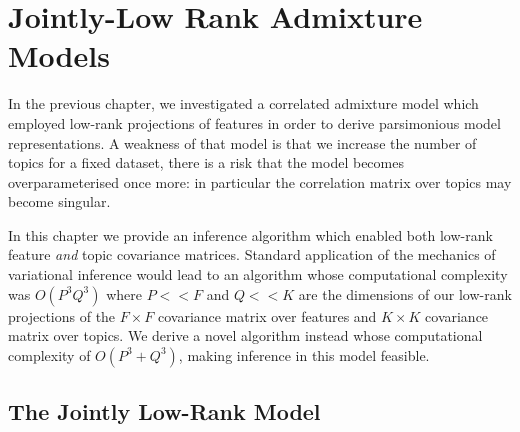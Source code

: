 %
\newcommand{\lm}[1] {
	#1^{\setminus m}
}

\newcommand \model[0] {
    \mathcal{M}
}

\newcommand \perplexity[1] {
    \mathcal{P} \left( { #1 } \right)
}

\newcommand \WTrain {
    \mathcal{W}^{(t)}
}

\newcommand \WQuery {
    \mathcal{W}^{(q)}
}

\newcommand \oneover[1] {
    \frac{1}{ {#1} }
}

\newcommand \samp[1] {
    { #1 }^{(s)}
}

\newcommand \etd[0] {
    \vv{\eta}_d
}

\newcommand \Ed {{ \vv{\xi}_d}}
\newcommand \Edj {{\xi_{dj}}}
\newcommand \Edk {{\xi_{dk}}}
\newcommand \AEdj {{\Lambda(\xi_{dj})}}
\newcommand \AEdk {{\Lambda(\xi_{dk})}}
\newcommand \AEd  {{ \bm{\Lambda}(\bm{\xi}_d) }}

\newcommand \Axi { { \Lambda_{\xi} } }
\newcommand \bxi { { \vv{b}_{\xi} } }
\newcommand \cxi { { c_{\xi} } }

\chapter{Jointly-Low Rank Admixture Models}
In the previous chapter, we investigated a correlated admixture model which employed low-rank projections of features in order to derive parsimonious model representations. A weakness of that model is that we increase the number of topics for a fixed dataset, there is a risk that the model becomes overparameterised once more: in particular the correlation matrix over topics may become singular.

In this chapter we provide an inference algorithm which enabled both low-rank feature \emph{and} topic covariance matrices. Standard application of the mechanics of variational inference would lead to an algorithm whose computational complexity was $O(P^3Q^3)$ where $P << F$ and $Q << K$ are the dimensions of our low-rank projections of the $F\times F$ covariance matrix over features and $K \times K$ covariance matrix over topics. We derive a novel algorithm instead whose computational complexity of $O(P^3 + Q^3)$, making inference in this model feasible.

\section{The Jointly Low-Rank Model}

